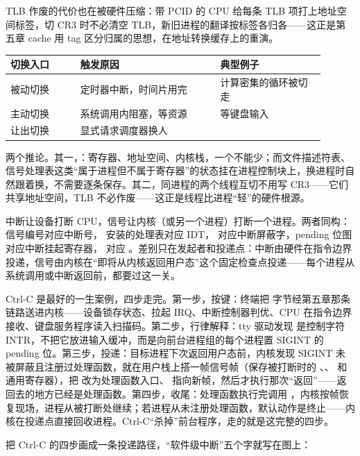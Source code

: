 TLB 作废的代价也在被硬件压缩：带 PCID 的 CPU 给每条 TLB 项打上地址空间标签，切 CR3 时不必清空 TLB，新旧进程的翻译按标签各归各——这正是第五章 cache 用 tag 区分归属的思想，在地址转换缓存上的重演。

\begin{longtable}{L{0.20\linewidth}L{0.40\linewidth}L{0.30\linewidth}}
\toprule
切换入口 & 触发原因 & 典型例子 \\
\midrule
被动切换 & 定时器中断，时间片用完 & 计算密集的循环被切走 \\
主动切换 & 系统调用内阻塞，等资源 &  等键盘输入 \\
让出切换 & 显式请求调度器换人 &  \\
\bottomrule
\end{longtable}

两个推论。其一，：寄存器、地址空间、内核栈，一个不能少；而文件描述符表、信号处理表这类“属于进程但不属于寄存器”的状态挂在进程控制块上，换进程时自然跟着换，不需要逐条保存。其二，同进程的两个线程互切不用写 CR3——它们共享地址空间，TLB 不必作废——这正是线程比进程“轻”的硬件根源。

中断让设备打断 CPU，信号让内核（或另一个进程）打断一个进程。两者同构：信号编号对应中断号， 安装的处理表对应 IDT， 对应中断屏蔽字，pending 位图对应中断挂起寄存器， 对应 。差别只在发起者和投递点：中断由硬件在指令边界投递，信号由内核在“即将从内核返回用户态”这个固定检查点投递——每个进程从系统调用或中断返回前，都要过这一关。

Ctrl-C 是最好的一生案例，四步走完。第一步，按键：终端把  字节经第五章那条链路送进内核——设备锁存状态、拉起 IRQ、中断控制器判优、CPU 在指令边界接收、键盘服务程序读入扫描码。第二步，行律解释：tty 驱动发现  是控制字符 INTR，不把它放进输入缓冲，而是向前台进程组的每个进程置 SIGINT 的 pending 位。第三步，投递：目标进程下次返回用户态前，内核发现 SIGINT 未被屏蔽且注册过处理函数，就在用户栈上搭一帧信号帧（保存被打断时的 、、 和通用寄存器），把  改为处理函数入口、 指向新帧，然后才执行那次“返回”——返回去的地方已经是处理函数。第四步，收尾：处理函数执行完调用 ，内核按帧恢复现场，进程从被打断处继续；若进程从未注册处理函数，默认动作是终止——内核在投递点直接回收进程。Ctrl-C“杀掉”前台程序，走的就是这完整的四步。

把 Ctrl-C 的四步画成一条投递路径，“软件级中断”五个字就写在图上：

